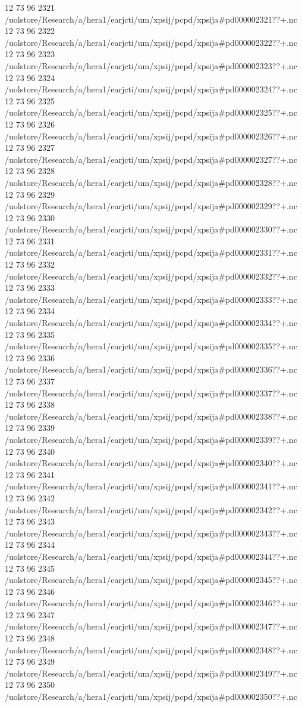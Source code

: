 12 73 96
2321
/uolstore/Research/a/hera1/earjcti/um/xpsij/pcpd/xpsija#pd000002321??+.nc
12 73 96
2322
/uolstore/Research/a/hera1/earjcti/um/xpsij/pcpd/xpsija#pd000002322??+.nc
12 73 96
2323
/uolstore/Research/a/hera1/earjcti/um/xpsij/pcpd/xpsija#pd000002323??+.nc
12 73 96
2324
/uolstore/Research/a/hera1/earjcti/um/xpsij/pcpd/xpsija#pd000002324??+.nc
12 73 96
2325
/uolstore/Research/a/hera1/earjcti/um/xpsij/pcpd/xpsija#pd000002325??+.nc
12 73 96
2326
/uolstore/Research/a/hera1/earjcti/um/xpsij/pcpd/xpsija#pd000002326??+.nc
12 73 96
2327
/uolstore/Research/a/hera1/earjcti/um/xpsij/pcpd/xpsija#pd000002327??+.nc
12 73 96
2328
/uolstore/Research/a/hera1/earjcti/um/xpsij/pcpd/xpsija#pd000002328??+.nc
12 73 96
2329
/uolstore/Research/a/hera1/earjcti/um/xpsij/pcpd/xpsija#pd000002329??+.nc
12 73 96
2330
/uolstore/Research/a/hera1/earjcti/um/xpsij/pcpd/xpsija#pd000002330??+.nc
12 73 96
2331
/uolstore/Research/a/hera1/earjcti/um/xpsij/pcpd/xpsija#pd000002331??+.nc
12 73 96
2332
/uolstore/Research/a/hera1/earjcti/um/xpsij/pcpd/xpsija#pd000002332??+.nc
12 73 96
2333
/uolstore/Research/a/hera1/earjcti/um/xpsij/pcpd/xpsija#pd000002333??+.nc
12 73 96
2334
/uolstore/Research/a/hera1/earjcti/um/xpsij/pcpd/xpsija#pd000002334??+.nc
12 73 96
2335
/uolstore/Research/a/hera1/earjcti/um/xpsij/pcpd/xpsija#pd000002335??+.nc
12 73 96
2336
/uolstore/Research/a/hera1/earjcti/um/xpsij/pcpd/xpsija#pd000002336??+.nc
12 73 96
2337
/uolstore/Research/a/hera1/earjcti/um/xpsij/pcpd/xpsija#pd000002337??+.nc
12 73 96
2338
/uolstore/Research/a/hera1/earjcti/um/xpsij/pcpd/xpsija#pd000002338??+.nc
12 73 96
2339
/uolstore/Research/a/hera1/earjcti/um/xpsij/pcpd/xpsija#pd000002339??+.nc
12 73 96
2340
/uolstore/Research/a/hera1/earjcti/um/xpsij/pcpd/xpsija#pd000002340??+.nc
12 73 96
2341
/uolstore/Research/a/hera1/earjcti/um/xpsij/pcpd/xpsija#pd000002341??+.nc
12 73 96
2342
/uolstore/Research/a/hera1/earjcti/um/xpsij/pcpd/xpsija#pd000002342??+.nc
12 73 96
2343
/uolstore/Research/a/hera1/earjcti/um/xpsij/pcpd/xpsija#pd000002343??+.nc
12 73 96
2344
/uolstore/Research/a/hera1/earjcti/um/xpsij/pcpd/xpsija#pd000002344??+.nc
12 73 96
2345
/uolstore/Research/a/hera1/earjcti/um/xpsij/pcpd/xpsija#pd000002345??+.nc
12 73 96
2346
/uolstore/Research/a/hera1/earjcti/um/xpsij/pcpd/xpsija#pd000002346??+.nc
12 73 96
2347
/uolstore/Research/a/hera1/earjcti/um/xpsij/pcpd/xpsija#pd000002347??+.nc
12 73 96
2348
/uolstore/Research/a/hera1/earjcti/um/xpsij/pcpd/xpsija#pd000002348??+.nc
12 73 96
2349
/uolstore/Research/a/hera1/earjcti/um/xpsij/pcpd/xpsija#pd000002349??+.nc
12 73 96
2350
/uolstore/Research/a/hera1/earjcti/um/xpsij/pcpd/xpsija#pd000002350??+.nc
